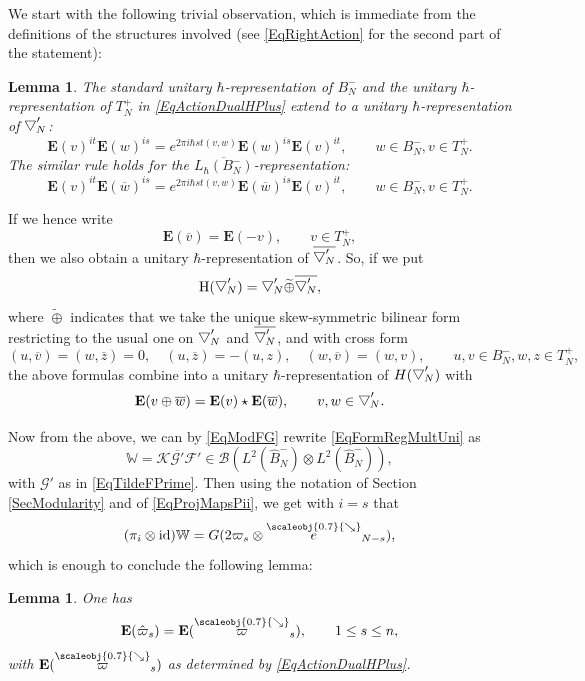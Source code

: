 \documentclass[11pt, reqno]{amsart}
\newtheorem{lemma}[theorem]{Lemma}
\theoremstyle{definition}
\numberwithin{equation}{section}
\def\Fc{\mathcal F'}
\newcommand{\Bc}{\mathcal{B}}
\newcommand{\eb}{\mathbf{E}}
\newcommand{\Gauss}{G}
\newcommand{\Kc}{\mathcal{K}}
\newcommand{\tFc}{\mathcal{G}'}
\newcommand{\Bor}{B}
\newcommand{\Tor}{T}
\newcommand{\sears}{\scaleobj{0.7}{\searrow}}
\newcommand{\seee}{\overset{\sears}{e}}
\newcommand{\sevarpi}{\overset{\sears}{\varpi}}
\newcommand{\id}{\mathrm{id}}
\newcommand{\Eb}{\mathbf{E}}
\newcommand{\wbtd}[1]{\raisebox{\depth}{$\bigtriangledown'$\!\!}_{#1}}
\newcommand{\Wbb}{\mathbb{W}}
\newcommand{\Heiss}{\mathrm{H}}
\begin{document}
We start with the following trivial observation, which is immediate from the definitions of the structures involved (see \eqref{EqRightAction} for the second part of the statement):

\begin{lemma}
The standard unitary $\hbar$-representation of $\Bor_N^-$ and the unitary $\hbar$-representation of $\Tor_N^+$ in \eqref{EqActionDualHPlus} extend to a unitary $\hbar$-representation of $\wbtd{N}$: 
\[
\Eb(v)^{it} \Eb(w)^{is} = e^{2\pi i \hbar st (v,w)}\Eb(w)^{is}\Eb(v)^{it},\qquad w\in \Bor_N^-,v\in \Tor_N^+.
\]
The similar rule holds for the $\overline{L_{\hbar}(\Bor_N^-)}$-representation:
\[
\Eb(v)^{it} \Eb(\overline{w})^{is} = e^{2\pi i \hbar st (v,w)}\Eb(\overline{w})^{is}\Eb(v)^{it},\qquad w\in \Bor_N^-,v\in \Tor_N^+.
\]
\end{lemma}

If we hence write 
\[
\Eb(\overline{v}) = \Eb(-v),\qquad v\in \Tor_N^+,
\]
then we also obtain a unitary $\hbar$-representation of $\overline{\wbtd{N}}$. So, if we put
\[
\Heiss(\wbtd{N}) =  \wbtd{N}\widetilde{\oplus} \overline{\wbtd{N}},
\]
where $\widetilde{\oplus}$ indicates that we take the unique skew-symmetric bilinear form restricting to the usual one on $\wbtd{N}$ and $\overline{\wbtd{N}}$, and with cross form
\[
(u,\overline{v}) = (w,\overline{z}) = 0,\quad (u,\overline{z}) = -(u,z),\quad (w,\overline{v}) = (w,v),\qquad u,v\in \Bor_N^-,w,z\in \Tor_N^+, 
\]
the above formulas combine into a unitary $\hbar$-representation of $H(\wbtd{N})$ with 
\begin{equation}\label{EqRepTwistDirSum}
\eb(v\oplus \overline{w}) = \eb(v)\star \eb(\overline{w}),\qquad v,w\in \wbtd{N}. 
\end{equation}

Now from the above, we can by \eqref{EqModFG} rewrite \eqref{EqFormRegMultUni} as 
\begin{equation}\label{EqFormRegMultUniAlt}
\Wbb =  \Kc\overline{\tFc} \Fc \in \Bc(L^2(\hat{\Bor}_N^-)\otimes L^2(\hat{\Bor}_N^-)),
\end{equation}
with $\tFc$ as in \eqref{EqTildeFPrime}. Then using the notation of Section \ref{SecModularity} and of \eqref{EqProjMapsPii}, we get with $i = s$ that 
\[
(\pi_i \otimes \id)\Wbb = \Gauss(2\varpi_s \otimes \seee_{N-s}),
\]
which is enough to conclude the following lemma: 
\begin{lemma}
One has
\begin{equation}
\eb(\hat{\varpi}_s) = \eb(\sevarpi_s),\qquad 1\leq s\leq n,
\end{equation}
with $\eb(\sevarpi_s)$ as determined by \eqref{EqActionDualHPlus}. 
\end{lemma}
\end{document}
